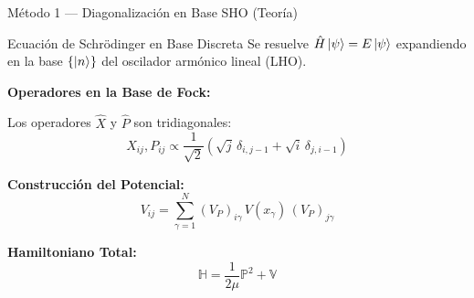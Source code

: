 \documentclass[aspectratio=169,10pt]{beamer}
\begin{document}
\begin{frame}{Método 1 — Diagonalización en Base SHO (Teoría)}

\begin{physbox}{Ecuación de Schrödinger en Base Discreta}
Se resuelve $\hat{H}\ket{\psi} = E\ket{\psi}$ expandiendo en la base $\{\ket{n}\}$ del oscilador armónico lineal (LHO).
\end{physbox}

\vspace{0.4cm}

\textbf{Operadores en la Base de Fock:}

Los operadores $\hat{X}$ y $\hat{P}$ son tridiagonales:
\[
  X_{ij} , P_{ij} \propto  \frac{1}{\sqrt{2}}\!\left(\sqrt{j}\,\delta_{i,j-1} + \sqrt{i}\,\delta_{j,i-1}\right)
\]

\vspace{0.2cm}

\textbf{Construcción del Potencial:}
\[
  V_{ij} = \sum_{\gamma=1}^N (V_P)_{i\gamma}\, V(x_\gamma)\, (V_P)_{j\gamma}
\]

\vspace{0.2cm}

\textbf{Hamiltoniano Total:}
\[
  \mathbb{H} = \frac{1}{2\mu}\mathbb{P}^2 + \mathbb{V}
\]

\end{frame}
\end{document}

